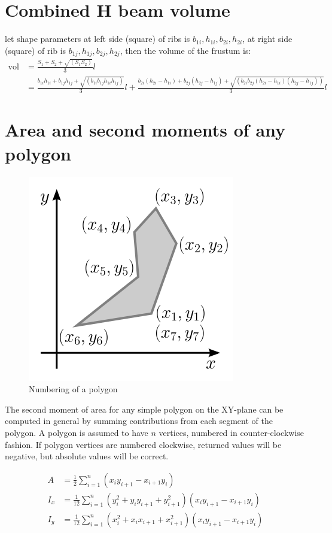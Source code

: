 \section{Combined H beam volume}
let shape parameters at left side (square) of ribs is $ b_{1i}, h_{1i}, b_{2i}, h_{2i} $, at right side (square) of rib is $ b_{1j}, h_{1j}, b_{2j}, h_{2j} $, then the volume of the frustum is:
\begin{equation}\label{eq: frustum volume}
\begin{split}
\mathrm{vol} &= \frac{S_1 + S_2 + \sqrt{(S_1 S_2)}}{3} l \\
&= \frac{b_{1i} h_{1i} + b_{1j} h_{1j} + \sqrt{(b_{1i} b_{1j} h_{1i} h_{1j} )}}{3} l + \frac{b_{2i} (h_{2i} - h_{1i}) + b_{2j} (h_{2j} - h_{1j}) + \sqrt{(b_{2i} b_{2j} (h_{2i} - h_{1i}) (h_{2j} - h_{1j}) )}}{3} l 
\end{split}
\end{equation}

\section{Area and second moments of any polygon}
\begin{figure}[h!]
	\centering
	\includegraphics[width=0.4\linewidth]{Figures/Moment_of_area_of_a_polygon}
	\caption{Numbering of a polygon}
	\label{fig:numberingofapolygon}
\end{figure}

The second moment of area for any simple polygon on the XY-plane can be computed in general by summing contributions from each segment of the polygon. A polygon is assumed to have $ n $ vertices, numbered in counter-clockwise fashion. If polygon vertices are numbered clockwise, returned values will be negative, but absolute values will be correct.

\begin{align*}
A &= \frac{1}{2} \sum_{i=1}^{n} (x_i y_{i+1} - x_{i+1} y_i) \\
I_{x} &= {\frac {1}{12}}\sum_{i=1}^{n}(y_{i}^{2}+y_{i}y_{i+1}+y_{i+1}^{2})(x_{i}y_{i+1}-x_{i+1}y_{i}) \\
I_{y} &= {\frac {1}{12}}\sum _{i=1}^{n}(x_{i}^{2}+x_{i}x_{i+1}+x_{i+1}^{2})(x_{i}y_{i+1}-x_{i+1}y_{i})
\end{align*}

